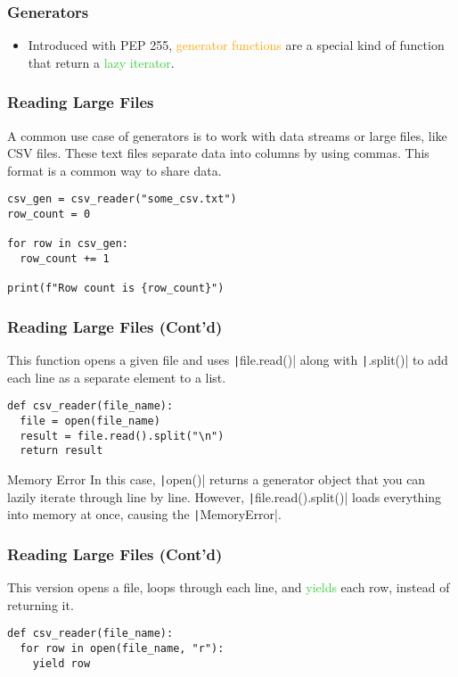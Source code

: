\documentclass{../py-lecture}
\begin{document}
\begin{frame}
  \frametitle{Generators}
  \begin{itemize}
    \item Introduced with PEP 255, \textcolor{Orange}{generator functions} are a special kind of function that return a \textcolor{LimeGreen}{lazy iterator}.
  \end{itemize}
\end{frame}

\begin{frame}[fragile]
  \frametitle{Reading Large Files}
  \begin{block}{}
    A common use case of generators is to work with data streams or large files, like CSV files.
    These text files separate data into columns by using commas. This format is a common way to share data.
  \end{block}
  \begin{verbatim}
csv_gen = csv_reader("some_csv.txt")
row_count = 0

for row in csv_gen:
  row_count += 1

print(f"Row count is {row_count}")
  \end{verbatim}
\end{frame}

\begin{frame}[fragile]
  \frametitle{Reading Large Files (Cont'd)}
  \begin{block}{}
  This function opens a given file and uses \texttt|file.read()| along with \texttt|.split()|
  to add each line as a separate element to a list.
  \end{block}
  \begin{verbatim}
def csv_reader(file_name):
  file = open(file_name)
  result = file.read().split("\n")
  return result
  \end{verbatim}
  \begin{block}{Memory Error}
    In this case, \texttt|open()| returns a generator object that you can lazily iterate through line by line.
    However, \texttt|file.read().split()| loads everything into memory at once, causing the \texttt|MemoryError|.
  \end{block}
\end{frame}

\begin{frame}[fragile]
  \frametitle{Reading Large Files (Cont'd)}
  \begin{block}{}
    This version opens a file, loops through each line, and \textcolor{LimeGreen}{yields} each row, instead of returning it.
  \end{block}
  \begin{verbatim}
def csv_reader(file_name):
  for row in open(file_name, "r"):
    yield row
  \end{verbatim}
\end{frame}
\end{document}
